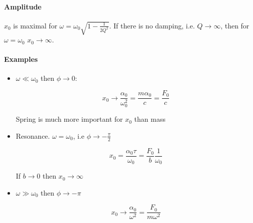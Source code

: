 \paragraph{Amplitude}
$x_0$ is maximal for $\omega = \omega_0\sqrt{1 - \frac{1}{2Q^2}}$. If there is no damping, i.e. $Q \to \infty$, then for $\omega = \omega_0$ $x_0 \to \infty$.

\paragraph{Examples}
\begin{itemize}
	\item $\omega \ll \omega_0$ then $\phi \to 0$:
	
	$$x_0 \to \frac{\alpha_0}{\omega_0^2} = \frac{m\alpha_0}{c}= \frac{F_0}{c}$$
	
	Spring is much more important for $x_0$ than mass
	\item Resonance. $\omega = \omega_0$, i.e $\phi \to -\frac{\pi}{2}$
	
	$$x_0 = \frac{\alpha_0 \tau}{\omega_0} = \frac{F_0}{b}\frac{1}{\omega_0}$$
	
	If $b \to 0$ then $x_0 \to \infty$
	\item $\omega \gg \omega_0$ then $\phi \to -\pi$
	
	$$x_0 \to \frac{\alpha_0}{\omega^2}= \frac{F_0}{m\omega^2}$$
	\end{itemize}